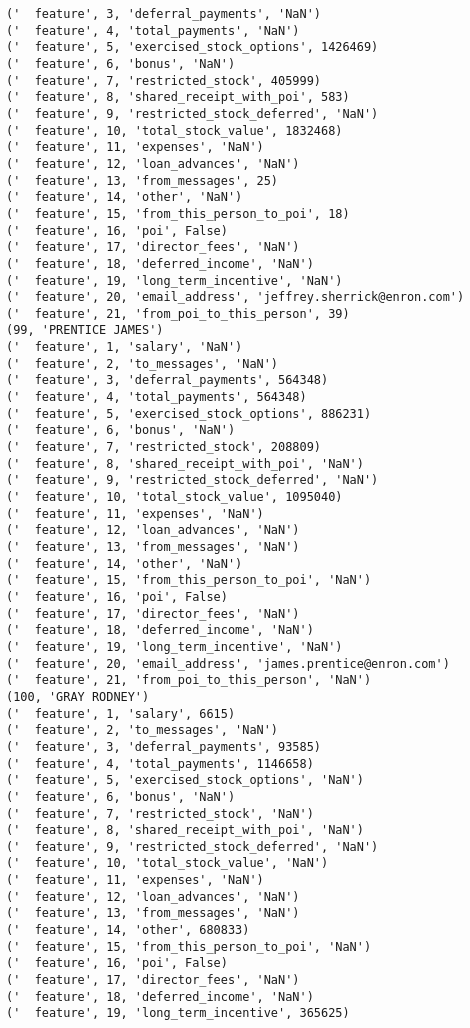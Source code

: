 \begin{verbatim}
('  feature', 3, 'deferral_payments', 'NaN')
('  feature', 4, 'total_payments', 'NaN')
('  feature', 5, 'exercised_stock_options', 1426469)
('  feature', 6, 'bonus', 'NaN')
('  feature', 7, 'restricted_stock', 405999)
('  feature', 8, 'shared_receipt_with_poi', 583)
('  feature', 9, 'restricted_stock_deferred', 'NaN')
('  feature', 10, 'total_stock_value', 1832468)
('  feature', 11, 'expenses', 'NaN')
('  feature', 12, 'loan_advances', 'NaN')
('  feature', 13, 'from_messages', 25)
('  feature', 14, 'other', 'NaN')
('  feature', 15, 'from_this_person_to_poi', 18)
('  feature', 16, 'poi', False)
('  feature', 17, 'director_fees', 'NaN')
('  feature', 18, 'deferred_income', 'NaN')
('  feature', 19, 'long_term_incentive', 'NaN')
('  feature', 20, 'email_address', 'jeffrey.sherrick@enron.com')
('  feature', 21, 'from_poi_to_this_person', 39)
(99, 'PRENTICE JAMES')
('  feature', 1, 'salary', 'NaN')
('  feature', 2, 'to_messages', 'NaN')
('  feature', 3, 'deferral_payments', 564348)
('  feature', 4, 'total_payments', 564348)
('  feature', 5, 'exercised_stock_options', 886231)
('  feature', 6, 'bonus', 'NaN')
('  feature', 7, 'restricted_stock', 208809)
('  feature', 8, 'shared_receipt_with_poi', 'NaN')
('  feature', 9, 'restricted_stock_deferred', 'NaN')
('  feature', 10, 'total_stock_value', 1095040)
('  feature', 11, 'expenses', 'NaN')
('  feature', 12, 'loan_advances', 'NaN')
('  feature', 13, 'from_messages', 'NaN')
('  feature', 14, 'other', 'NaN')
('  feature', 15, 'from_this_person_to_poi', 'NaN')
('  feature', 16, 'poi', False)
('  feature', 17, 'director_fees', 'NaN')
('  feature', 18, 'deferred_income', 'NaN')
('  feature', 19, 'long_term_incentive', 'NaN')
('  feature', 20, 'email_address', 'james.prentice@enron.com')
('  feature', 21, 'from_poi_to_this_person', 'NaN')
(100, 'GRAY RODNEY')
('  feature', 1, 'salary', 6615)
('  feature', 2, 'to_messages', 'NaN')
('  feature', 3, 'deferral_payments', 93585)
('  feature', 4, 'total_payments', 1146658)
('  feature', 5, 'exercised_stock_options', 'NaN')
('  feature', 6, 'bonus', 'NaN')
('  feature', 7, 'restricted_stock', 'NaN')
('  feature', 8, 'shared_receipt_with_poi', 'NaN')
('  feature', 9, 'restricted_stock_deferred', 'NaN')
('  feature', 10, 'total_stock_value', 'NaN')
('  feature', 11, 'expenses', 'NaN')
('  feature', 12, 'loan_advances', 'NaN')
('  feature', 13, 'from_messages', 'NaN')
('  feature', 14, 'other', 680833)
('  feature', 15, 'from_this_person_to_poi', 'NaN')
('  feature', 16, 'poi', False)
('  feature', 17, 'director_fees', 'NaN')
('  feature', 18, 'deferred_income', 'NaN')
('  feature', 19, 'long_term_incentive', 365625)

\end{verbatim}
